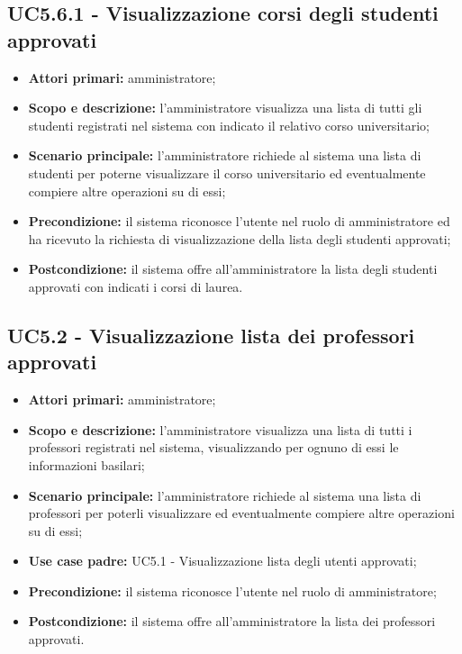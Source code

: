 \documentclass[AnalisiDeiRequisiti.tex]{subfiles}
\begin{document}
\subsection{UC5.6.1 - Visualizzazione corsi degli studenti approvati}
\begin{itemize}
	\item \textbf{Attori primari:} amministratore;
	\item \textbf{Scopo e descrizione:} l'amministratore visualizza una lista di tutti gli studenti registrati nel sistema con indicato il relativo corso universitario;
	\item \textbf{Scenario principale:} l'amministratore richiede al sistema una lista di studenti per poterne visualizzare il corso universitario ed eventualmente compiere altre operazioni su di essi;
	\item \textbf{Precondizione:} il sistema riconosce l'utente nel ruolo di amministratore ed ha ricevuto la richiesta di visualizzazione della lista degli studenti approvati;
	\item \textbf{Postcondizione:} il sistema offre all'amministratore la lista degli studenti approvati con indicati i corsi di laurea.
\end{itemize}
\subsection{UC5.2 - Visualizzazione lista dei professori approvati}
\begin{itemize}
	\item \textbf{Attori primari:} amministratore;
	\item \textbf{Scopo e descrizione:} l'amministratore visualizza una lista di tutti i professori registrati nel sistema, visualizzando per ognuno di essi le informazioni basilari;
	\item \textbf{Scenario principale:} l'amministratore richiede al sistema una lista di professori per poterli visualizzare ed eventualmente compiere altre operazioni su di essi;
	\item \textbf{Use case padre:} UC5.1 - Visualizzazione lista degli utenti approvati;
	\item \textbf{Precondizione:} il sistema riconosce l'utente nel ruolo di amministratore; 
	\item \textbf{Postcondizione:} il sistema offre all'amministratore la lista dei professori approvati.
\end{itemize}
\end{document}
